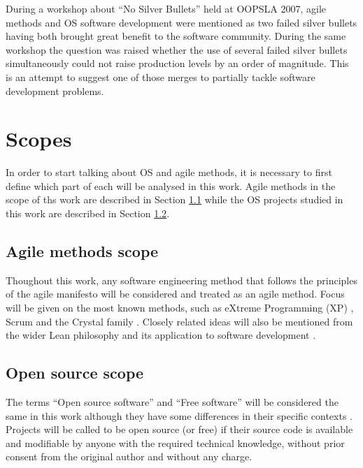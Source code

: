 \documentclass[lnbip]{svmultln}
\begin{document}
During a workshop \cite{conference:oopsla2007} about ``No Silver
Bullets'' \cite{brooks1987} held at OOPSLA 2007, agile methods and OS
software development were mentioned as two failed silver bullets
having both brought great benefit to the software community. During
the same workshop the question was raised whether the use of several
failed silver bullets simultaneously could not raise production levels
by an order of magnitude. This is an attempt to suggest one of those
merges to partially tackle software development problems.


\section{Scopes}
\label{sec:scope}

In order to start talking about OS and agile methods, it is necessary
to first define which part of each will be analysed in this
work. Agile methods in the scope of ths work are described in Section
\ref{subsec:agile-scope} while the OS projects studied in this work
are described in Section \ref{subsec:os-scope}.

\subsection{Agile methods scope}
\label{subsec:agile-scope}

Thoughout this work, any software engineering method that follows the
principles of the agile manifesto \cite{url:agilemanifesto} will be
considered and treated as an agile method. Focus will be given on the
most known methods, such as eXtreme Programming (XP) \cite{XP2002},
Scrum \cite{schwaber2004} and the Crystal family
\cite{cockburn2002}. Closely related ideas will also be mentioned from
the wider Lean philosophy \cite{ohno1998} and its application to
software development \cite{poppendieck2005}.

\subsection{Open source scope}
\label{subsec:os-scope}

The terms ``Open source software'' and ``Free software'' will be
considered the same in this work although they have some differences
in their specific contexts \cite[Ch. 1, Free Versus Open
source]{fogel2005}. Projects will be called to be open source (or
free) if their source code is available and modifiable by anyone with
the required technical knowledge, without prior consent from the
original author and without any charge.
\end{document}
